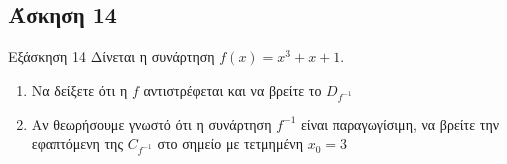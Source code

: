 \documentclass[greek]{beamer}
\begin{document}
\subsection{Άσκηση 14}
\begin{frame}[label=Άσκηση14]{Εξάσκηση 14}
  Δίνεται η συνάρτηση $f(x)=x^3+x+1$.
  \begin{enumerate}
    \item<1-> Να δείξετε ότι η $f$ αντιστρέφεται και να βρείτε το $D_{f^{-1}}$
    \item<2-> Αν θεωρήσουμε γνωστό ότι η συνάρτηση $f^{-1}$ είναι παραγωγίσιμη, να βρείτε την εφαπτόμενη της $C_{f^{-1}}$ στο σημείο με τετμημένη $x_0=3$
  \end{enumerate}


\end{frame}
\end{document}
